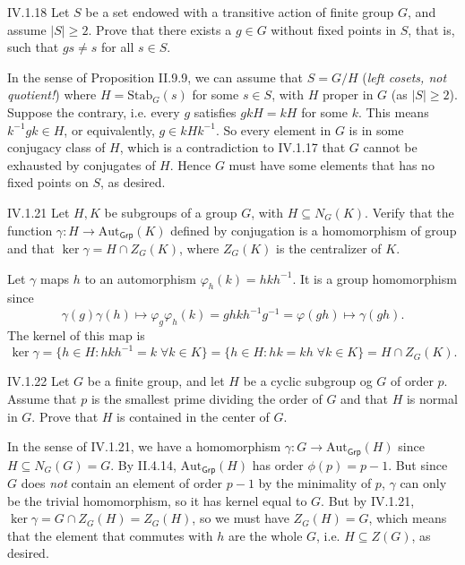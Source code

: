 \begin{problem}{IV.1.18}
Let $S$ be a set endowed with a transitive action of finite group $G$, and assume $|S| \geq 2$. Prove that there exists a $g \in G$ without fixed points in $S$, that is, such that $gs \neq s$ for all $s \in S$.
\end{problem}
\begin{pf}
In the sense of Proposition II.9.9, we can assume that $S = G/H$ (\emph{left cosets, not quotient!}) where $H = \text{Stab}_G(s)$ for some $s \in S$, with $H$ proper in $G$ (as $|S| \geq 2$). Suppose the contrary, i.e. every $g$ satisfies $gkH = kH$ for some $k$. This means $k^{-1}gk \in H$, or equivalently, $g \in kHk^{-1}$. So every element in $G$ is in some conjugacy class of $H$, which is a contradiction to IV.1.17 that $G$ cannot be exhausted by conjugates of $H$. Hence $G$ must have some elements that has no fixed points on $S$, as desired.
\end{pf}


\begin{problem}{IV.1.21}
Let $H,K$ be subgroups of a group $G$, with $H \subseteq N_G(K)$. Verify that the function $\gamma: H \to \text{Aut}_\mathsf{Grp}(K)$ defined by conjugation is a homomorphism of group and that $\ker \gamma = H \cap Z_G(K)$, where $Z_G(K)$ is the centralizer of $K$.	
\end{problem}
\begin{pf}
Let $\gamma$ maps $h$ to an automorphism $\varphi_h(k) = hkh^{-1}$. It is a group homomorphism since
\[
\gamma(g)\gamma(h) \mapsto \varphi_g \varphi_h(k) = ghkh^{-1}g^{-1} = \varphi(gh) \mapsto \gamma(gh).
\]
The kernel of this map is 
\[
\ker \gamma = \{h \in H: hkh^{-1} = k \; \forall k \in K\} = \{h \in H: hk = kh \; \forall k \in K\} = H \cap Z_G(K).	
\]
\end{pf}

\begin{problem}{IV.1.22}
Let $G$ be a finite group, and let $H$ be a cyclic subgroup og $G$ of order $p$. Assume that $p$ is the smallest prime dividing the order of $G$ and that $H$ is normal in $G$. Prove that $H$ is contained in the center of $G$.
\end{problem}
\begin{pf}
In the sense of IV.1.21, we have a homomorphism $\gamma:G \to \text{Aut}_\mathsf{Grp}(H)$ since $H \subseteq N_G(G) = G$. By II.4.14, $\text{Aut}_\mathsf{Grp}(H)$ has order $\phi(p)=p-1$. But since $G$ does \emph{not} contain an element of order $p-1$ by the minimality of $p$, $\gamma$ can only be the trivial homomorphism, so it has kernel equal to $G$. But by IV.1.21, $\ker \gamma = G \cap Z_G(H) = Z_G(H)$, so we must have $Z_G(H) = G$, which means that the element that commutes with $h$ are the whole $G$, i.e. $H \subseteq Z(G)$, as desired. 
\end{pf}

